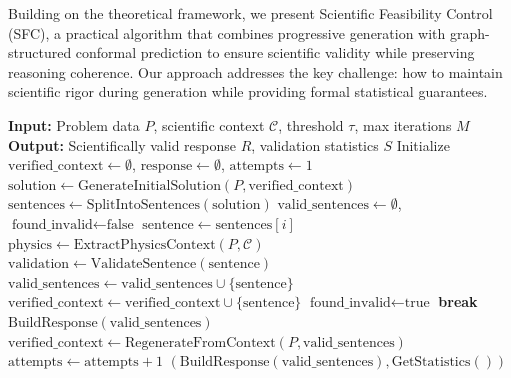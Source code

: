 \documentclass{uai2026} %
\theoremstyle{remark}
\theoremstyle{plain}
\theoremstyle{definition}
\begin{document}
Building on the theoretical framework, we present Scientific Feasibility Control (SFC), a practical algorithm that combines progressive generation with graph-structured conformal prediction to ensure scientific validity while preserving reasoning coherence. Our approach addresses the key challenge: how to maintain scientific rigor during generation while providing formal statistical guarantees.
\begin{algorithm}[!t]
\small
\caption{Progressive Scientific Generation with Validation}
\label{alg:progressive}
\begin{algorithmic}[1]
\STATE \textbf{Input:} Problem data $P$, scientific context $\mathcal{C}$, threshold $\tau$, max iterations $M$
\STATE \textbf{Output:} Scientifically valid response $R$, validation statistics $S$
\STATE Initialize $\text{verified\_context} \leftarrow \emptyset$, $\text{response} \leftarrow \emptyset$, $\text{attempts} \leftarrow 1$
    \STATE $\text{solution} \leftarrow \text{GenerateInitialSolution}(P,\text{verified\_context})$
    \STATE $\text{sentences} \leftarrow \text{SplitIntoSentences}(\text{solution})$
    \STATE $\text{valid\_sentences} \leftarrow \emptyset$, $\text{found\_invalid} \leftarrow \text{false}$
        \STATE $\text{sentence} \leftarrow \text{sentences}[i]$
        \STATE $\text{physics} \leftarrow \text{ExtractPhysicsContext}(P,\mathcal{C})$
        \STATE $\text{validation} \leftarrow \text{ValidateSentence}(\text{sentence})$
            \STATE $\text{valid\_sentences} \leftarrow \text{valid\_sentences} \cup \{\text{sentence}\}$
            \STATE $\text{verified\_context} \leftarrow \text{verified\_context} \cup \{\text{sentence}\}$
        \ELSE
            \STATE $\text{found\_invalid} \leftarrow \text{true}$
            \STATE \textbf{break} 
        \ENDIF
    \ENDFOR
        \RETURN $\text{BuildResponse}(\text{valid\_sentences})$
    \ENDIF
        \STATE $\text{verified\_context} \leftarrow \text{RegenerateFromContext}(P,\text{valid\_sentences})$
        \STATE $\text{attempts} \leftarrow \text{attempts} + 1$
    \ENDIF
\ENDWHILE
\RETURN $(\text{BuildResponse}(\text{valid\_sentences}), \text{GetStatistics}())$
\end{algorithmic}
\end{algorithm}
\vspace{-0.5\baselineskip}
\end{document}

